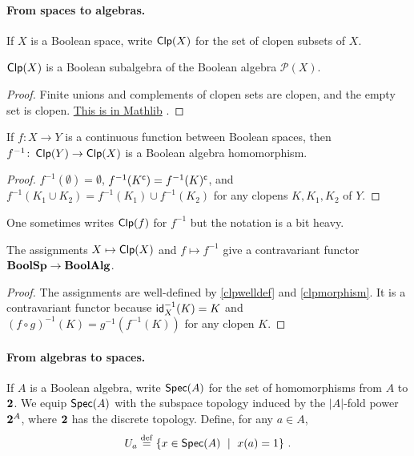\documentclass[a4paper,10pt]{article}
\numberwithin{theorem}{section}
\newcommand{\docref}[3]{%
    \href{%
        https://leanprover-community.github.io/mathlib4_docs/Mathlib/#1.html\##2%
    }{#3}%
}
\begin{document}
\paragraph{From spaces to algebras.}
If $X$ is a Boolean space, write $\operatorname*{\mathsf{Clp}}(X)$ for the set of clopen
subsets of $X$. 

\begin{proposition}\label{clpwelldef}
    $\operatorname*{\mathsf{Clp}}(X)$ is a Boolean subalgebra of the Boolean algebra $\mathcal{P}(X)$.
\end{proposition}
\begin{proof}
    Finite unions and complements of clopen sets are clopen, and the empty set
    is clopen.
    \docref{Topology/Sets/Closeds}{TopologicalSpace.Clopens.instBooleanAlgebraClopens}{This
    is in Mathlib}.
\end{proof} 
\begin{proposition}\label{clpmorphism}
    If $f \colon X \to Y$ is a continuous function between Boolean spaces, then
    $f^{-1} \colon \operatorname*{\mathsf{Clp}}(Y) \to \operatorname*{\mathsf{Clp}}(X)$ is a Boolean algebra homomorphism.
\end{proposition}
\begin{proof}
    $f^{-1}(\emptyset) = \emptyset$, $f^{-1}(K^{\mathsf{c}}) = f^{-1}(K)^{\mathsf{c}}$, and
    $f^{-1}(K_1 \cup K_2) = f^{-1}(K_1) \cup f^{-1}(K_2)$ for any clopens $K,
    K_1, K_2$ of $Y$. 
\end{proof}
One sometimes writes $\operatorname*{\mathsf{Clp}}(f)$ for $f^{-1}$ but the notation is a bit heavy.
\begin{proposition}
    The assignments $X \mapsto \operatorname*{\mathsf{Clp}}(X)$ and $f \mapsto f^{-1}$ give a
contravariant functor $\mathbf{BoolSp} \to \mathbf{BoolAlg}$.
\end{proposition}
\begin{proof}
    The assignments are well-defined by \cref{clpwelldef} and
    \cref{clpmorphism}. It is a contravariant functor because
    $\mathsf{id}_X^{-1}(K) = K$ and $(f \circ g)^{-1}(K) = g^{-1}(f^{-1}(K))$ for
    any clopen $K$.
\end{proof}

\paragraph{From algebras to spaces.}
If $A$ is a Boolean algebra, write $\operatorname*{\mathsf{Spec}}(A)$ for the set of homomorphisms from
$A$ to $\mathbf{2}$. We equip $\operatorname*{\mathsf{Spec}}(A)$ with the subspace topology induced by the
$|A|$-fold power $\mathbf{2}^{A}$, where $\mathbf{2}$ has the discrete topology.
Define, for any $a \in A$,
\[ U_a \stackrel{\mathrm{def}}{=} \{ x \in \operatorname*{\mathsf{Spec}}(A) \ \mid \ x(a) = 1 \} \ . \]
\end{document}
